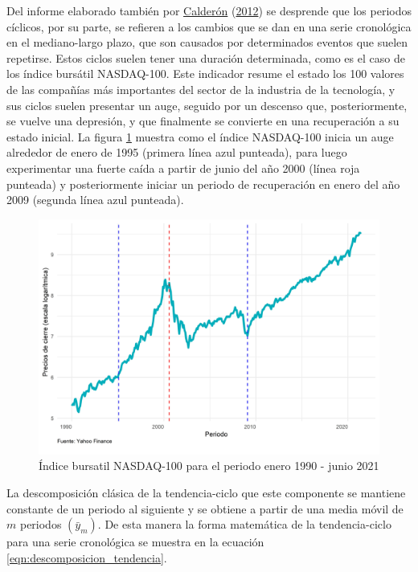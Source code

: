 \documentclass[
]{article}
\begin{document}
Del informe elaborado también por
\protect\hyperlink{ref-calderon2012estadistica}{Calderón}
(\protect\hyperlink{ref-calderon2012estadistica}{2012}) se desprende que
los periodos cíclicos, por su parte, se refieren a los cambios que se
dan en una serie cronológica en el mediano-largo plazo, que son causados
por determinados eventos que suelen repetirse. Estos ciclos suelen tener
una duración determinada, como es el caso de los índice bursátil
NASDAQ-100. Este indicador resume el estado los 100 valores de las
compañías más importantes del sector de la industria de la tecnología, y
sus ciclos suelen presentar un auge, seguido por un descenso que,
posteriormente, se vuelve una depresión, y que finalmente se convierte
en una recuperación a su estado inicial. La figura
\ref{fig:ejemplo_ciclo} muestra como el índice NASDAQ-100 inicia un auge
alrededor de enero de 1995 (primera línea azul punteada), para luego
experimentar una fuerte caída a partir de junio del año 2000 (línea roja
punteada) y posteriormente iniciar un periodo de recuperación en enero
del año 2009 (segunda línea azul punteada).

\begin{figure}[!h]
\includegraphics[width=1\linewidth,height=1\textheight]{Tesis_files/figure-latex/ejemplo_ciclo-1} \caption{Índice bursatil NASDAQ-100 para el periodo enero 1990 - junio 2021}\label{fig:ejemplo_ciclo}
\end{figure}

La descomposición clásica de la tendencia-ciclo que este componente se
mantiene constante de un periodo al siguiente y se obtiene a partir de
una media móvil de \(m\) periodos \(\left(\bar y_{m}\right)\). De esta
manera la forma matemática de la tendencia-ciclo para una serie
cronológica se muestra en la ecuación
\ref{eqn:descomposicion_tendencia}.
\end{document}
